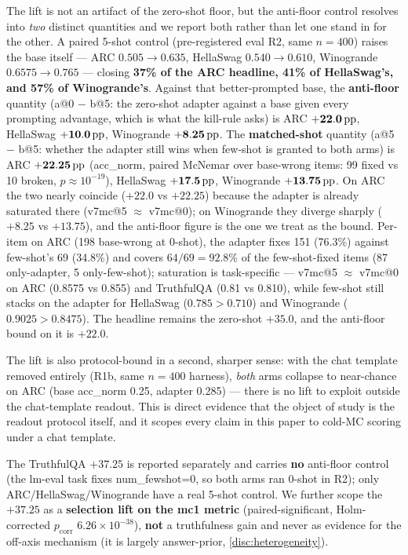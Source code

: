 The lift is not an artifact of the zero-shot floor, but the anti-floor control
resolves into \emph{two} distinct quantities and we report both rather than let one
stand in for the other. A paired 5-shot control (pre-registered eval R2, same
$n{=}400$) raises the base itself --- ARC $0.505{\rightarrow}0.635$, HellaSwag
$0.540{\rightarrow}0.610$, Winogrande $0.6575{\rightarrow}0.765$ --- closing
\textbf{37\% of the ARC headline, 41\% of HellaSwag's, and 57\% of Winogrande's}.
Against that better-prompted base, the \textbf{anti-floor} quantity (a@0 $-$ b@5:
the zero-shot adapter against a base given every prompting advantage, which is what
the kill-rule asks) is ARC $\mathbf{+22.0\,\mathrm{pp}}$, HellaSwag $\mathbf{+10.0\,\mathrm{pp}}$,
Winogrande $\mathbf{+8.25\,\mathrm{pp}}$. The \textbf{matched-shot} quantity (a@5 $-$ b@5:
whether the adapter still wins when few-shot is granted to both arms) is ARC
$\mathbf{+22.25\,\mathrm{pp}}$ (acc\_norm, paired McNemar over base-wrong items: 99 fixed vs
10 broken, $p{\approx}10^{-19}$), HellaSwag $\mathbf{+17.5\,\mathrm{pp}}$, Winogrande
$\mathbf{+13.75\,\mathrm{pp}}$. On ARC the two nearly coincide ($+22.0$ vs $+22.25$) because
the adapter is already saturated there (v7mc@5 ${\approx}$ v7mc@0); on Winogrande
they diverge sharply ($+8.25$ vs $+13.75$), and the anti-floor figure is the one we
treat as the bound. Per-item on ARC (198 base-wrong at 0-shot), the adapter fixes
151 (76.3\%) against few-shot's 69 (34.8\%) and covers $64/69 = \mathbf{92.8\%}$ of
the few-shot-fixed items (87 only-adapter, 5 only-few-shot); saturation is
task-specific --- v7mc@5 ${\approx}$ v7mc@0 on ARC (0.8575 vs 0.855) and TruthfulQA
(0.81 vs 0.810), while few-shot still stacks on the adapter for HellaSwag
($0.785 > 0.710$) and Winogrande ($0.9025 > 0.8475$). The headline remains the
zero-shot $+35.0$, and the anti-floor bound on it is $\mathbf{+22.0}$.

The lift is also protocol-bound in a second, sharper sense: with the chat template
removed entirely (R1b, same $n{=}400$ harness), \emph{both} arms collapse to
near-chance on ARC (base acc\_norm 0.25, adapter 0.285) --- there is no lift to
exploit outside the chat-template readout. This is direct evidence that the object
of study is the readout protocol itself, and it scopes every claim in this paper to
cold-MC scoring under a chat template.

The TruthfulQA $+37.25$ is reported separately and carries \textbf{no} anti-floor
control (the lm-eval  task fixes num\_fewshot=0, so both arms
ran 0-shot in R2); only ARC/HellaSwag/Winogrande have a real 5-shot control. We
further scope the $+37.25$ as a \textbf{selection lift on the mc1 metric}
(paired-significant, Holm-corrected $p_{\mathrm{corr}}$ $6.26\times10^{-38}$),
\textbf{not} a truthfulness gain and never as evidence for the off-axis mechanism
(it is largely answer-prior, \cref{disc:heterogeneity}).

